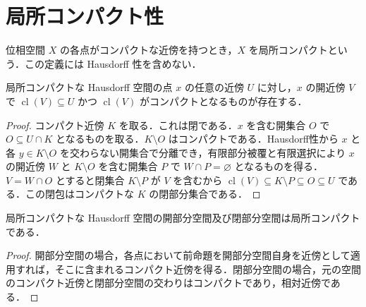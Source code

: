 \section{局所コンパクト性}
\begin{defn}[局所コンパクト空間]
位相空間 $X$ の各点がコンパクトな近傍を持つとき，$X$ を局所コンパクトという．この定義には Hausdorff 性を含めない．
\end{defn}
\begin{prop}[局所コンパクトHausdorff空間の近傍の縮小]
局所コンパクトな Hausdorff 空間の点 $x$ の任意の近傍 $U$ に対し，$x$ の開近傍 $V$ で $\operatorname{cl}(V)\subseteq U$ かつ $\operatorname{cl}(V)$ がコンパクトとなるものが存在する．
\end{prop}
\begin{proof}
コンパクト近傍 $K$ を取る．これは閉である．$x$ を含む開集合 $O$ で $O\subseteq U\cap K$ となるものを取る．$K\setminus O$ はコンパクトである．Hausdorff性から $x$ と各 $y\in K\setminus O$ を交わらない開集合で分離でき，有限部分被覆と有限選択により $x$ の開近傍 $W$ と $K\setminus O$ を含む開集合 $P$ で $W\cap P=\varnothing$ となるものを得る．$V=W\cap O$ とすると閉集合 $K\setminus P$ が $V$ を含むから $\operatorname{cl}(V)\subseteq K\setminus P\subseteq O\subseteq U$ である．この閉包はコンパクトな $K$ の閉部分集合である．
\end{proof}
\begin{prop}[局所コンパクト性の開部分空間と閉部分空間への保存]
局所コンパクトな Hausdorff 空間の開部分空間及び閉部分空間は局所コンパクトである．
\end{prop}
\begin{proof}
開部分空間の場合，各点において前命題を開部分空間自身を近傍として適用すれば，そこに含まれるコンパクト近傍を得る．閉部分空間の場合，元の空間のコンパクト近傍と閉部分空間の交わりはコンパクトであり，相対近傍である．
\end{proof}

